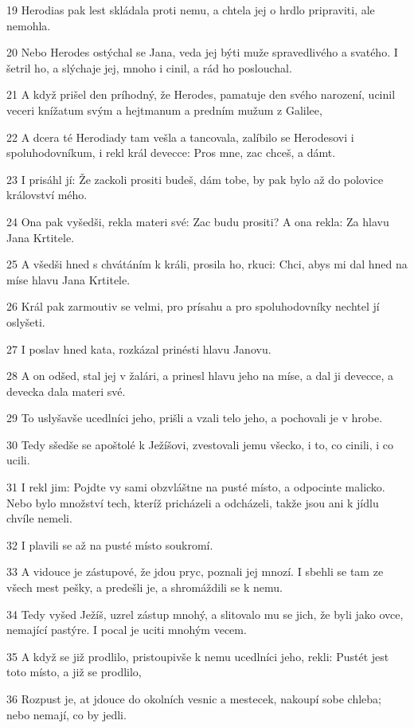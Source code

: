 \par 19 Herodias pak lest skládala proti nemu, a chtela jej o hrdlo pripraviti, ale nemohla.
\par 20 Nebo Herodes ostýchal se Jana, veda jej býti muže spravedlivého a svatého. I šetril ho, a slýchaje jej, mnoho i cinil, a rád ho poslouchal.
\par 21 A když prišel den príhodný, že Herodes, pamatuje den svého narození, ucinil veceri knížatum svým a hejtmanum a predním mužum z Galilee,
\par 22 A dcera té Herodiady tam vešla a tancovala, zalíbilo se Herodesovi i spoluhodovníkum, i rekl král devecce: Pros mne, zac chceš, a dámt.
\par 23 I prisáhl jí: Že zackoli prositi budeš, dám tobe, by pak bylo až do polovice království mého.
\par 24 Ona pak vyšedši, rekla materi své: Zac budu prositi? A ona rekla: Za hlavu Jana Krtitele.
\par 25 A všedši hned s chvátáním k králi, prosila ho, rkuci: Chci, abys mi dal hned na míse hlavu Jana Krtitele.
\par 26 Král pak zarmoutiv se velmi, pro prísahu a pro spoluhodovníky nechtel jí oslyšeti.
\par 27 I poslav hned kata, rozkázal prinésti hlavu Janovu.
\par 28 A on odšed, stal jej v žalári, a prinesl hlavu jeho na míse, a dal ji devecce, a devecka dala materi své.
\par 29 To uslyšavše ucedlníci jeho, prišli a vzali telo jeho, a pochovali je v hrobe.
\par 30 Tedy sšedše se apoštolé k Ježíšovi, zvestovali jemu všecko, i to, co cinili, i co ucili.
\par 31 I rekl jim: Pojdte vy sami obzvláštne na pusté místo, a odpocinte malicko. Nebo bylo množství tech, kteríž pricházeli a odcházeli, takže jsou ani k jídlu chvíle nemeli.
\par 32 I plavili se až na pusté místo soukromí.
\par 33 A vidouce je zástupové, že jdou pryc, poznali jej mnozí. I sbehli se tam ze všech mest pešky, a predešli je, a shromáždili se k nemu.
\par 34 Tedy vyšed Ježíš, uzrel zástup mnohý, a slitovalo mu se jich, že byli jako ovce, nemající pastýre. I pocal je uciti mnohým vecem.
\par 35 A když se již prodlilo, pristoupivše k nemu ucedlníci jeho, rekli: Pustét jest toto místo, a již se prodlilo,
\par 36 Rozpust je, at jdouce do okolních vesnic a mestecek, nakoupí sobe chleba; nebo nemají, co by jedli.
